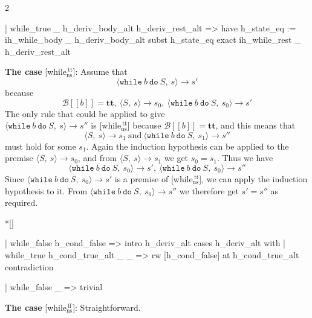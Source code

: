 \begin{paracol}{2}
\begin{leftcolumn}
\begin{Lean_Code}
    | while_true
        _ h_deriv_body_alt
        h_deriv_rest_alt =>
      have h_state_eq :=
        ih_while_body _
        h_deriv_body_alt
      subst h_state_eq
      exact ih_while_rest _
             h_deriv_rest_alt
    \end{Lean_Code}
\end{leftcolumn}
\begin{rightcolumn}
\textbf{The case} [while$_{\text{ns}}^{\ \text{tt}}$]: Assume that
\[
\langle \mathtt{while}\ b\ \mathtt{do}\ S,\ s \rangle \to s'
\]
because
\[
\mathcal{B}[\![b]\!] = \mathbf{tt}, \ \langle S,\ s \rangle \to s_0, \ \langle \mathtt{while}\ b\ \mathtt{do}\ S,\ s_0 \rangle \to s'
\]
The only rule that could be applied to give \\
\(\langle \mathtt{while}\ b\ \mathtt{do}\ S,\ s \rangle \to s''\)
is [while$_{\text{ns}}^{\ \text{tt}}$] because \(\mathcal{B}[\![b]\!] = \mathbf{tt}\), and this means that
\[
\langle S,\ s \rangle \to s_1\ \mbox{and}\ \langle \mathtt{while}\ b\ \mathtt{do}\ S,\ s_1 \rangle \to s''
\]
must hold for some \(s_1\). Again the induction hypothesis can be applied to the premise
\(\langle S,\ s \rangle \to s_0\), and from \(\langle S,\ s \rangle \to s_1\) we get \(s_0 = s_1\).
Thus we have
\[
\langle \mathtt{while}\ b\ \mathtt{do}\ S,\ s_0 \rangle \to s', \ \langle \mathtt{while}\ b\ \mathtt{do}\ S,\ s_0 \rangle \to s''
\]
Since \(\langle \mathtt{while}\ b\ \mathtt{do}\ S,\ s_0 \rangle \to s'\) is a premise of [while$_{\text{ns}}^{\ \text{tt}}$],
we can apply the induction hypothesis to it. From \(\langle \mathtt{while}\ b\ \mathtt{do}\ S,\ s_0 \rangle \to s''\)
we therefore get \(s' = s''\) as required.
\end{rightcolumn}
\vspace{2em}


\switchcolumn[1]*[]
\begin{leftcolumn}
    \begin{Lean_Code}
  | while_false
      h_cond_false =>
    intro h_deriv_alt
    cases h_deriv_alt with
    | while_true
        h_cond_true_alt
        _ _ =>
      rw [h_cond_false] at
          h_cond_true_alt
      contradiction

    | while_false
        _ =>
      trivial
    \end{Lean_Code}
\end{leftcolumn}
\begin{rightcolumn}
\textbf{The case} [while$_{\text{ns}}^{\ \text{ff}}$]: Straightforward.
\end{rightcolumn}
\end{paracol}
\vspace{1em}

